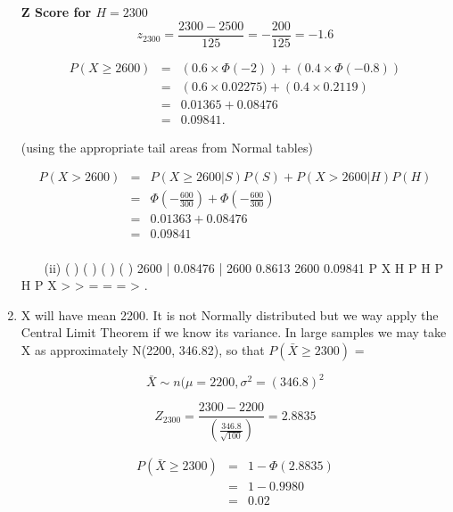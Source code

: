 \documentclass[a4paper,12pt]{article}
\begin{document}
\begin{enumerate}
\begin{framed}
\noindent \textbf{Z Score for $H = 2300$}
\[z_{2300}  = \frac{2300 - 2500}{125}  = -\frac{200}{125} = -1.6\]
\end{framed}

\begin{eqnarray*} 
P(X \geq 2600) &=& \left(0.6 \times \Phi(-2)\right) + \left(0.4 \times \Phi(-0.8)\right)\\
&=& \left(0.6 \times 0.02275) + \left(0.4 \times 0.2119\right)\\
 &=& 0.01365 + 0.08476 \\ 
 &=& 0.09841.
\end{eqnarray*}

(using the appropriate tail areas from Normal tables)





\begin{eqnarray*}
P(X > 2600) &=& P(X \geq 2600|S)P(S) + P(X > 2600|H)P(H) \\
 &=& \Phi \left( - \frac{600}{300}\right) + \Phi \left( - \frac{600}{300}\right) \\
 &=& 0.01363 + 0.08476 \\
 &=& 0.09841 \\
\end{eqnarray*}

   
(ii) ( ) ( ) ( )
( )
2600 | 0.08476 | 2600 0.8613
2600 0.09841
P X H P H
P H
P X
>
> = = =
>
.

\item X will have mean 2200. It is not Normally distributed but we way
apply the Central Limit Theorem if we know its variance. In large samples we
may take X as approximately N(2200, 346.82), so that $P(\bar{X}\geq 2300)$ = 
  
\[\bar{X} \sim n(\mu = 2200, \sigma^2 = (346.8)^2\]
               
 \[Z_{2300}  =   \frac{2300-2200}{       \left(\frac{346.8}{\sqrt{100}} \right)} = 2.8835\]



\begin{eqnarray*} 
P(\bar{X}\geq 2300) &=& 1- \Phi(2.8835)\\  &=& 1- 0.9980 \\&=& 0.02
\end{eqnarray*}

\end{enumerate}

  

                                              
\end{document}
